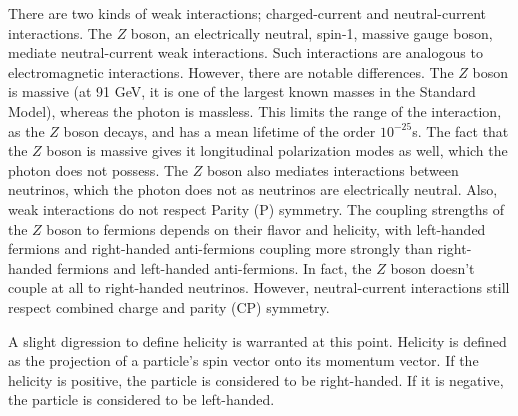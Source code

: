 \documentclass[12pt,a4paper,openright,twoside]{report}
\begin{document}
There are two kinds of weak interactions; charged-current and neutral-current interactions. The $Z$ boson, an electrically neutral, spin-1, massive gauge boson, mediate neutral-current weak interactions. Such interactions are analogous to electromagnetic interactions. However, there are notable differences. The $Z$ boson is massive (at 91 GeV, it is one of the largest known masses in the Standard Model), whereas the photon is massless. This limits the range of the interaction, as the $Z$ boson decays, and has a mean lifetime of the order $10^{-25}$s. The fact that the $Z$ boson is massive gives it longitudinal polarization modes\cite{quarks_and_leptons} as well, which the photon does not possess. The $Z$ boson also mediates interactions between neutrinos, which the photon does not as neutrinos are electrically neutral. Also, weak interactions do not respect Parity (P) symmetry. The coupling strengths of the $Z$ boson to fermions depends on their flavor and helicity, with left-handed fermions and right-handed anti-fermions coupling more strongly than right-handed fermions and left-handed anti-fermions. In fact, the $Z$ boson doesn't couple at all to right-handed neutrinos. However, neutral-current interactions still respect combined charge and parity (CP) symmetry.

A slight digression to define helicity is warranted at this point. Helicity is defined as the projection of a particle's spin vector onto its momentum vector. If the helicity is positive, the particle is considered to be right-handed. If it is negative, the particle is considered to be left-handed.
\end{document}
